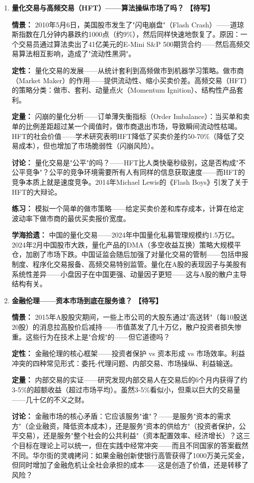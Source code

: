 \documentclass[a4paper,11pt]{ctexart}
\newcommand{\draft}{\textcolor{orange!80!black}{\textbf{【待写】}}}
\begin{document}
\begin{enumerate}
\item[\textbf{第23课}] \textbf{量化交易与高频交易（HFT）——算法操纵市场了吗？} \draft

\textbf{情景：} 2010年5月6日，美国股市发生了"闪电崩盘"（Flash Crash）——道琼斯指数在几分钟内暴跌约1000点（约9\%），然后同样快速地恢复了。原因：一个交易员通过算法卖出了41亿美元的E-Mini S\&P 500期货合约——然后高频交易算法相互影响，造成了"流动性黑洞"。

\textbf{定性：} 量化交易的发展——从统计套利到高频做市到机器学习策略。做市商（Market Maker）的作用——提供流动性、缩小买卖价差。高频交易（HFT）的策略分类：做市、套利、动量点火（Momentum Ignition）、结构性产品套利。

\textbf{定量：} 闪崩的量化分析——订单薄失衡指标（Order Imbalance）：当买单和卖单的比例差距超过某一个阈值时，做市商退出市场，导致瞬间流动性枯竭。HFT的社会价值——学术研究表明HFT降低了买卖价差约50-70\%（降低了交易成本），但也增加了市场脆弱性（闪崩风险）。

\textbf{讨论：} 量化交易是"公平"的吗？——HFT比人类快毫秒级别，这是否构成"不公平竞争"？公平的竞争环境需要所有人有同样的信息获取速度——而HFT的竞争本质上就是速度竞争。2014年Michael Lewis的《Flash Boys》引发了关于HFT的大辩论。

\textbf{练习：} 模拟一个简单的做市策略——给定买卖价差和库存成本，计算在给定波动率下做市商的最优买卖报价宽度。

\textbf{学海拾遗：} 中国的量化交易——2024年中国量化私募管理规模约1.5万亿。2024年2月中国股市大跌，量化产品的DMA（多空收益互换）策略大规模平仓，加剧了市场下跌。中国证监会随后加强了对量化交易的管制——包括申报制度、程序化交易报备、高频交易特别监管。量化在A股的表现因子与美股有系统性差异——小盘因子在中国更强、动量因子更短——这与A股的散户主导结构有关。

\item[\textbf{第24课}] \textbf{金融伦理——资本市场到底在服务谁？} \draft

\textbf{情景：} 2015年A股股灾期间，一些上市公司的大股东通过"高送转"（每10股送20股）的消息拉高股价后减持——市值蒸发了几十万亿，散户投资者损失惨重。这些行为在技术上是"合规"的——但它道德吗？

\textbf{定性：} 金融伦理的核心框架——投资者保护 vs 资本形成 vs 市场效率。利益冲突的四种常见形式：委托-代理问题、内部交易、市场操纵、利益输送。

\textbf{定量：} 内部交易的实证——研究发现内部交易人在交易后的6个月内获得了约3-5\%的超额收益（超过市场平均）。虽然3-5\%看似小，但乘以巨大的交易量——几十亿的不义之财。

\textbf{讨论：} 金融市场的核心矛盾：它应该服务"谁"？——是服务"资本的需求方"（企业融资，降低资本成本），还是服务"资本的供给方"（投资者保护，公平交易），还是服务"整个社会的公共利益"（资本配置效率、经济增长）？这三个目标在理论上可以统一，但在实践中经常冲突——而且不同国家的答案截然不同。华尔街的灵魂拷问：如果金融创新使银行高管获得了1000万美元奖金，但同时增加了金融危机让全社会承担的成本——这是创造了价值，还是转移了风险？


\end{enumerate}
\end{document}

